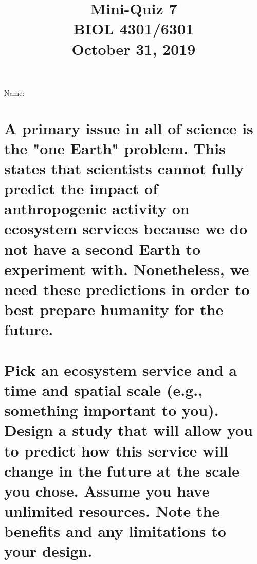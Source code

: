 \documentclass[12pt, notitlepage]{article}   	%
\title{
	\textbf{
		Mini-Quiz 7
	} \\
	\large BIOL 4301/6301 \\
	\large October 31, 2019 \\
}
\date{\vspace{-5ex}}
\begin{document}
{\selectfont %

\large{Name:}

{\let\newpage\relax\maketitle}

\section{\small{A primary issue in all of science is the "one Earth" problem.
This states that scientists cannot fully predict the impact of anthropogenic activity
on ecosystem services because we do not have a second Earth to experiment with.
Nonetheless, we need these predictions in order to best prepare humanity for the future.
\\
\\
Pick an ecosystem service and a time and spatial scale (e.g., something important to you). 
Design a study that will allow you to predict how this
service will change in the future at the scale you chose. Assume you have unlimited resources. 
Note the benefits and any limitations to your design.}}


} %
\end{document}
